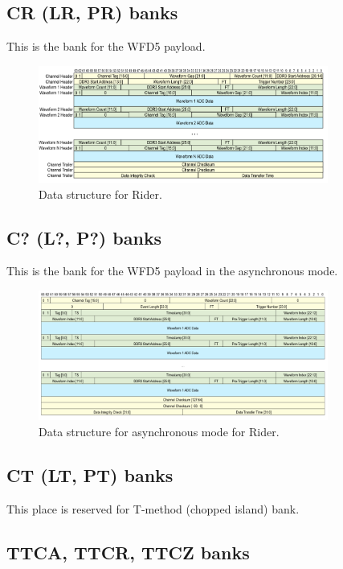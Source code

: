 {\subsection*{CR (LR, PR) banks}

This is the bank for the WFD5 payload.

\begin{figure}[htbp]
\centering
\includegraphics[width=0.85\textwidth]{pics/RiderData.pdf} 
\caption{Data structure for Rider.}\label{fig:RiderData}
\end{figure}

\subsection*{C? (L?, P?) banks}

This is the bank for the WFD5 payload in the asynchronous mode.

\begin{figure}[htbp]
\centering
\includegraphics[width=0.85\textwidth]{pics/AsyncRiderData.pdf} 
\caption{Data structure for asynchronous mode for Rider.}\label{fig:AsyncRiderData}
\end{figure}

\subsection*{CT (LT, PT) banks}

{\color{red}This place is reserved for T-method (chopped island) bank.}

\subsection*{TTCA, TTCR, TTCZ banks}

}
